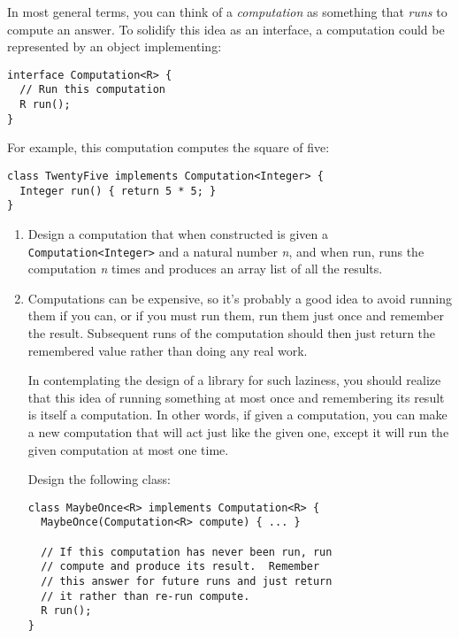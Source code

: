 \documentclass[12pt]{article}                   %
\def\pts#1{\marginpar{\footnotesize \raggedright  \fbox{#1 {\sc Points}}}}
\begin{document}
\begin{problem} \pts{20}

In most general terms, you can think of a \emph{computation} as something that
\emph{runs} to compute an answer.  To solidify this idea as an interface, a
computation could be represented by an object implementing:

\begin{verbatim}
interface Computation<R> {
  // Run this computation
  R run();
}
\end{verbatim}

\noindent
For example, this computation computes the square of five:

\begin{verbatim}
class TwentyFive implements Computation<Integer> {
  Integer run() { return 5 * 5; }
}
\end{verbatim}

\begin{enumerate}

\item Design a computation that when constructed is given a
 \texttt{Computation<Integer>} and a natural number \emph{n}, and when
 run, runs the computation \emph{n} times and produces an array list
of all the results.

\newpage
\item

Computations can be expensive, so it's probably a good idea to avoid
 running them if you can, or if you must run them, run them just once
 and remember the result. Subsequent runs of the computation should
 then just return the remembered value rather than doing any real
 work.

In contemplating the design of a library for such laziness, you should
 realize that this idea of running something at most once and
 remembering its result is itself a computation.  In other words, if
 given a computation, you can make a new computation that will act
 just like the given one, except it will run the given computation at
 most one time.

Design the following class:

\begin{verbatim}
class MaybeOnce<R> implements Computation<R> {
  MaybeOnce(Computation<R> compute) { ... }

  // If this computation has never been run, run
  // compute and produce its result.  Remember
  // this answer for future runs and just return
  // it rather than re-run compute.
  R run();
}
\end{verbatim}
\end{enumerate}


\end{problem}
\end{document}
